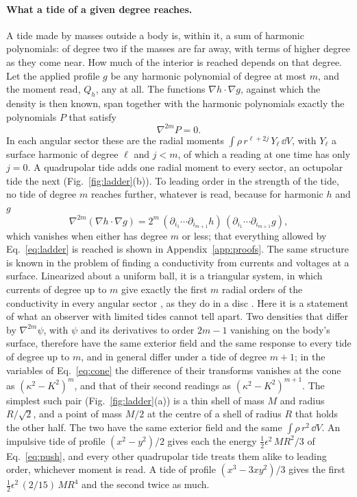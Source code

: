 \paragraph{What a tide of a given degree reaches.} A tide made by masses
outside a body is, within it, a sum of harmonic polynomials: of degree two if the
masses are far away, with terms of higher degree as they come near. How much
of the interior is reached depends on that degree. Let the applied profile $g$
be any harmonic polynomial of degree at most $m$, and the moment read, $Q_h$,
any at all. The functions $\nabla h\cdot\nabla g$, against which the density
is then known, span together with the harmonic polynomials exactly the
polynomials $P$ that satisfy
\begin{equation}\label{eq:ladder}
\nabla^{2m}P = 0 .
\end{equation}
In each angular sector these are the radial moments
$\int\rho\,r^{\ell+2j}\,Y_\ell\,\dd V$, with $Y_\ell$ a surface harmonic of
degree $\ell$ and $j < m$, of which a reading at one
time has only $j = 0$. A quadrupolar tide adds one radial moment to every
sector, an octupolar tide the next (Fig.~\ref{fig:ladder}(b)). To leading order in the strength of the tide, no tide of degree $m$ reaches
further, whatever is read, because for harmonic $h$ and $g$
\begin{equation}\label{eq:ladder-identity}
\nabla^{2m}(\nabla h\cdot\nabla g) = 2^m\,
(\partial_{i_1}\!\cdots\partial_{i_{m+1}}h)\,
(\partial_{i_1}\!\cdots\partial_{i_{m+1}}g) ,
\end{equation}
which vanishes when either has degree $m$ or less; that everything allowed by
Eq.~\eqref{eq:ladder} is reached is shown in Appendix~\ref{app:proofs}. The
same structure is known in the problem of finding a conductivity from
currents and voltages at a surface. Linearized about a uniform ball, it is
a triangular system, in which currents of degree up to $m$ give exactly the
first $m$ radial orders of the conductivity in every angular sector
\cite{GardeHirvensalo2025}, as they do in a disc \cite{GardeHyvonen2024}.
Here it is a statement of what an observer with limited tides cannot tell
apart. Two
densities that differ by $\nabla^{2m}\psi$, with $\psi$ and its derivatives to
order $2m - 1$ vanishing on the body's surface, therefore have the same exterior
field and the same response to every tide of degree up to $m$, and in general
differ under a tide of degree $m + 1$; in the variables
of Eq.~\eqref{eq:cone} the difference of their transforms vanishes at the cone
as $(\kappa^2 - K^2)^m$, and that of their second readings as
$(\kappa^2 - K^2)^{m+1}$. The simplest such pair (Fig.~\ref{fig:ladder}(a)) is
a thin shell of mass $M$ and radius $R/\sqrt2$, and a point of mass $M/2$ at the centre of a shell of
radius $R$ that holds the other half. The two have the same exterior field
and the same $\int\rho\,r^2\,\dd V$. An impulsive tide of profile
$(x^2 - y^2)/2$ gives each the energy $\tfrac12\epsilon^2\,MR^2/3$ of
Eq.~\eqref{eq:push}, and every other quadrupolar tide treats them alike
to leading order, whichever moment is read. A tide of profile $(x^3 - 3xy^2)/3$ gives the first
$\tfrac12\epsilon^2\,(2/15)\,MR^4$ and the second twice as much.


